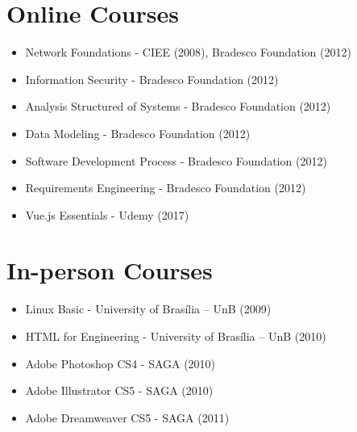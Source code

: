 \section{Online Courses}
\begin{itemize}
    \item Network Foundations - CIEE (2008), Bradesco Foundation (2012)
    \item Information Security - Bradesco Foundation (2012)
    \item Analysis Structured of Systems - Bradesco Foundation (2012)
    \item Data Modeling - Bradesco Foundation (2012)
    \item Software Development Process - Bradesco Foundation (2012)
    \item Requirements Engineering - Bradesco Foundation (2012)
    \item Vue.js Essentials - Udemy (2017)
\end{itemize}

\section{In-person Courses}
\begin{itemize}
    \item Linux Basic - University of Brasília – UnB (2009)
    \item HTML for Engineering - University of Brasília – UnB (2010)
    \item Adobe Photoshop CS4 - SAGA (2010)
    \item Adobe Illustrator CS5 - SAGA (2010)
    \item Adobe Dreamweaver CS5 - SAGA (2011)
\end{itemize}